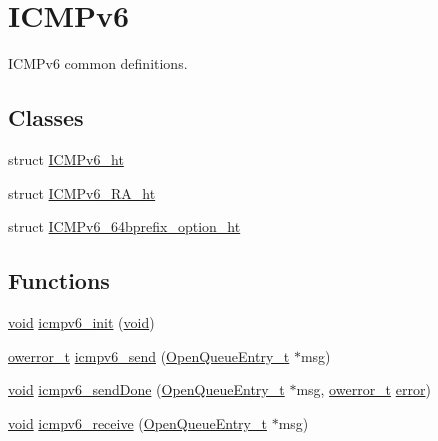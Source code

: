 \hypertarget{group___i_c_m_pv6}{}\section{I\+C\+M\+Pv6}
\label{group___i_c_m_pv6}


I\+C\+M\+Pv6 common definitions.  


\subsection*{Classes}
\begin{DoxyCompactItemize}
\item 
struct \hyperlink{struct_i_c_m_pv6__ht}{I\+C\+M\+Pv6\+\_\+ht}
\item 
struct \hyperlink{struct_i_c_m_pv6___r_a__ht}{I\+C\+M\+Pv6\+\_\+\+R\+A\+\_\+ht}
\item 
struct \hyperlink{struct_i_c_m_pv6__64bprefix__option__ht}{I\+C\+M\+Pv6\+\_\+64bprefix\+\_\+option\+\_\+ht}
\end{DoxyCompactItemize}
\subsection*{Functions}
\begin{DoxyCompactItemize}
\item 
\hyperlink{usb__devapi_8h_afabf60e7f57651d6d595a02c75f07cd0}{void} \hyperlink{group___i_c_m_pv6_ga9b95cb157223a7055d984734d0a808a6}{icmpv6\+\_\+init} (\hyperlink{usb__devapi_8h_afabf60e7f57651d6d595a02c75f07cd0}{void})
\item 
\hyperlink{opendefs_8h_af20b7c3ed9d2ba19e56a309ad9314803}{owerror\+\_\+t} \hyperlink{group___i_c_m_pv6_ga3415aa981903be4fee8052a07e87bd7f}{icmpv6\+\_\+send} (\hyperlink{struct_open_queue_entry__t}{Open\+Queue\+Entry\+\_\+t} $\ast$msg)
\item 
\hyperlink{usb__devapi_8h_afabf60e7f57651d6d595a02c75f07cd0}{void} \hyperlink{group___i_c_m_pv6_gae528a32af88598b7f56514e3c1ddea3e}{icmpv6\+\_\+send\+Done} (\hyperlink{struct_open_queue_entry__t}{Open\+Queue\+Entry\+\_\+t} $\ast$msg, \hyperlink{opendefs_8h_af20b7c3ed9d2ba19e56a309ad9314803}{owerror\+\_\+t} \hyperlink{disk_8c_ad018a3100b2dabad325a0800152db297}{error})
\item 
\hyperlink{usb__devapi_8h_afabf60e7f57651d6d595a02c75f07cd0}{void} \hyperlink{group___i_c_m_pv6_ga2b5a2c1c1f7e47888b32e19f973d3953}{icmpv6\+\_\+receive} (\hyperlink{struct_open_queue_entry__t}{Open\+Queue\+Entry\+\_\+t} $\ast$msg)
\end{DoxyCompactItemize}


